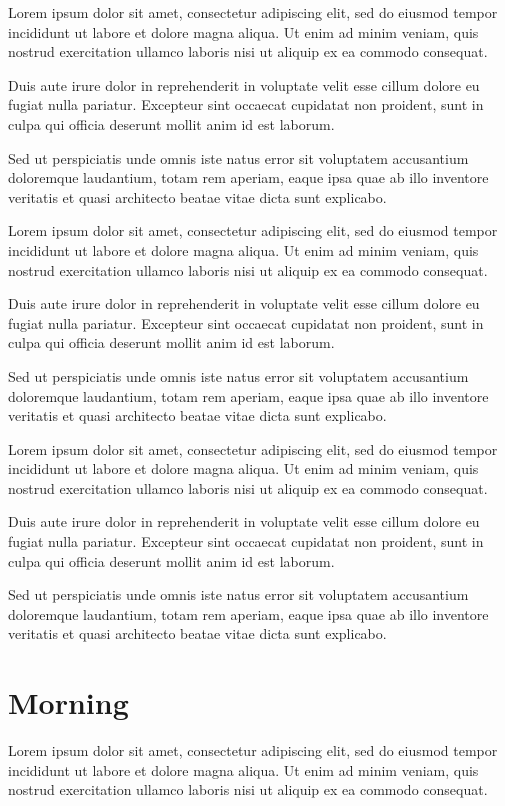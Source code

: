 \documentclass[oneside]{memoir}
\begin{document}
Lorem ipsum dolor sit amet, consectetur adipiscing elit, sed do eiusmod tempor incididunt ut labore et dolore magna aliqua. Ut enim ad minim veniam, quis nostrud exercitation ullamco laboris nisi ut aliquip ex ea commodo consequat.

Duis aute irure dolor in reprehenderit in voluptate velit esse cillum dolore eu fugiat nulla pariatur. Excepteur sint occaecat cupidatat non proident, sunt in culpa qui officia deserunt mollit anim id est laborum.

Sed ut perspiciatis unde omnis iste natus error sit voluptatem accusantium doloremque laudantium, totam rem aperiam, eaque ipsa quae ab illo inventore veritatis et quasi architecto beatae vitae dicta sunt explicabo.

Lorem ipsum dolor sit amet, consectetur adipiscing elit, sed do eiusmod tempor incididunt ut labore et dolore magna aliqua. Ut enim ad minim veniam, quis nostrud exercitation ullamco laboris nisi ut aliquip ex ea commodo consequat.

Duis aute irure dolor in reprehenderit in voluptate velit esse cillum dolore eu fugiat nulla pariatur. Excepteur sint occaecat cupidatat non proident, sunt in culpa qui officia deserunt mollit anim id est laborum.

Sed ut perspiciatis unde omnis iste natus error sit voluptatem accusantium doloremque laudantium, totam rem aperiam, eaque ipsa quae ab illo inventore veritatis et quasi architecto beatae vitae dicta sunt explicabo.

Lorem ipsum dolor sit amet, consectetur adipiscing elit, sed do eiusmod tempor incididunt ut labore et dolore magna aliqua. Ut enim ad minim veniam, quis nostrud exercitation ullamco laboris nisi ut aliquip ex ea commodo consequat.

Duis aute irure dolor in reprehenderit in voluptate velit esse cillum dolore eu fugiat nulla pariatur. Excepteur sint occaecat cupidatat non proident, sunt in culpa qui officia deserunt mollit anim id est laborum.

Sed ut perspiciatis unde omnis iste natus error sit voluptatem accusantium doloremque laudantium, totam rem aperiam, eaque ipsa quae ab illo inventore veritatis et quasi architecto beatae vitae dicta sunt explicabo.
\chapter{Morning}
Lorem ipsum dolor sit amet, consectetur adipiscing elit, sed do eiusmod tempor incididunt ut labore et dolore magna aliqua. Ut enim ad minim veniam, quis nostrud exercitation ullamco laboris nisi ut aliquip ex ea commodo consequat.
\end{document}
